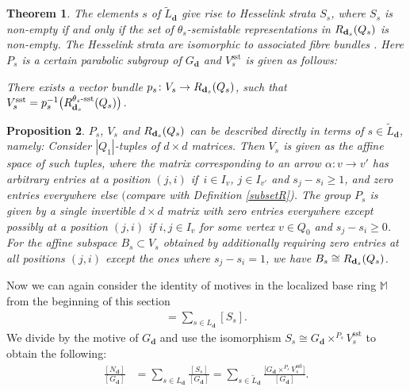 \documentclass[pdftex]{sigma}
\numberwithin{equation}{section}
\newtheorem{Theorem}{Theorem}[section]
\newtheorem{Proposition}[Theorem]{Proposition}
\theoremstyle{definition}
\begin{document}
\begin{Theorem} \label{theo LB}
The elements $s$ of $\widetilde{L}_{\mathbf{d}}$ give rise to Hesselink strata $S_s$, where $S_s$ is non-empty if and only if the set of $\theta_{s}$-semistable representations in $R_{{\bf d}_s}(Q_s)$ is non-empty.
The Hesselink strata are isomorphic to associated fibre bundles
.
Here $P_s$ is a certain parabolic subgroup of $G_{\mathbf{d}}$ and $V_s^{\mathrm{sst}}$ is given as follows:

There exists a vector bundle
$
p_s\colon V_s \rightarrow R_{{\bf d}_s} (Q_s)$,
such that
$
V_s^{\mathrm{sst}} = p_s^{-1} \bigl(R_{{\bf d}_s}^{\theta_s\text{\rm -sst}}(Q_s)\bigr)$.
\end{Theorem}

\begin{Proposition} \label{prop LB}
$P_s$, $V_s$ and $R_{{\bf d}_s}(Q_s)$ can be described directly in terms of $s \in \widetilde{L}_{\mathbf{d}}$, namely:
Consider $|Q_1|$-tuples of $d \times d$ matrices. Then $V_s$ is given as the affine space of such tuples, where the matrix corresponding to an arrow $\alpha\colon v\rightarrow v'$ has arbitrary entries at a position $(j,i)$ if~${i\in I_v}$, $j\in I_{v'}$ and $s_j - s_i \geq 1$, and zero entries everywhere else $($compare with Definition {\rm\ref{subsetR})}. The group $P_s$ is given by a single invertible $d \times d$ matrix with zero entries everywhere except possibly at a position $(j,i)$ if $i,j\in I_v$ for some vertex $v\in Q_0$ and $s_j - s_i \geq 0$. For the affine subspace $B_s\subset V_s$ obtained by additionally requiring zero entries at all positions $(j,i)$ except the ones where $s_j - s_i = 1$, we have $B_s \cong R_{{\bf d}_s}(Q_s)$.
\end{Proposition}

Now we can again consider the identity of motives in the localized base ring $\mathbb{M}$ from the beginning of this section
\begin{align*}
[N_{\mathbf{d}}] = \sum_{s \in L_{\mathbf{d}}} [S_s] .
\end{align*}
We divide by the motive of $G_ {\mathbf{d}}$ and use the isomorphism $S_s \cong G_{\mathbf{d}} \times^{P_s} V_s^{\mathrm{sst}}$ to obtain the following:
\begin{align*}
\frac{[ N_{\mathbf{d}}]}{[ G_{\mathbf{d}}]}
&= \sum_{s \in L_{\mathbf{d}}} \frac{[S_s]}{[G_{\mathbf{d}}]}
= \sum_{s \in \widetilde{L}_{\mathbf{d}}} \frac{\big[G_{\mathbf{d}} \times^{P_s} V_s^{\mathrm{sst}}\big]}{[G_{\mathbf{d}}]} .
\end{align*}
\end{document}
